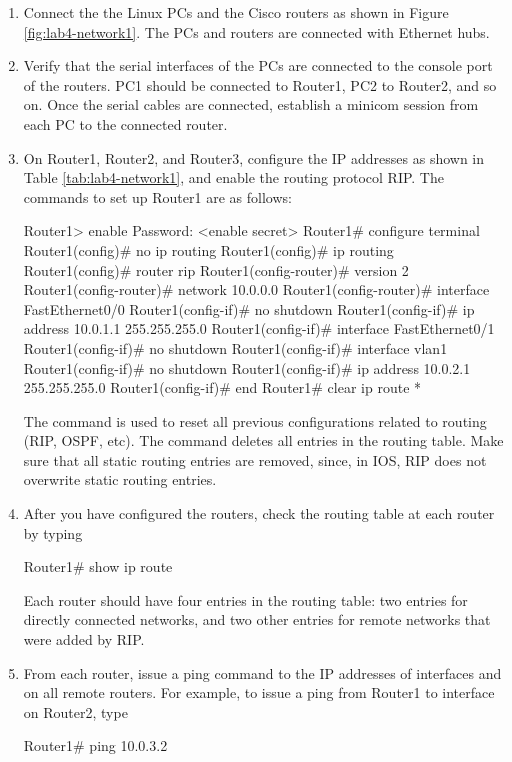 \begin{enumerate}
	\item Connect the the Linux PCs and the Cisco routers as shown in Figure \ref{fig:lab4-network1}. The PCs and routers are connected with Ethernet hubs.
	\item Verify that the serial interfaces of the PCs are connected to the console port of the routers. PC1 should be connected to Router1, PC2 to Router2, and so on. Once the serial cables are connected, establish a minicom session from each PC to the connected router.
	\item On Router1, Router2, and Router3, configure the IP addresses as shown in Table \ref{tab:lab4-network1}, and enable the routing protocol RIP. The commands to set up Router1 are as follows:
		\begin{cmdblock}
	Router1> enable Password: <enable secret>
	Router1# configure terminal
	Router1(config)# no ip routing
	Router1(config)# ip routing
	Router1(config)# router rip
	Router1(config-router)# version 2 
	Router1(config-router)# network 10.0.0.0 
	Router1(config-router)# interface FastEthernet0/0 
	Router1(config-if)# no shutdown
	Router1(config-if)# ip address 10.0.1.1 255.255.255.0 
	Router1(config-if)# interface FastEthernet0/1 
	Router1(config-if)# no shutdown
	Router1(config-if)# interface vlan1
	Router1(config-if)# no shutdown
	Router1(config-if)# ip address 10.0.2.1 255.255.255.0 
	Router1(config-if)# end
	Router1# clear ip route *
		\end{cmdblock}
		The command  is used to reset all previous configurations related to routing (RIP, OSPF, etc). The command  deletes all entries in the routing table. Make sure that all static routing entries are removed, since, in IOS, RIP does not overwrite static routing entries.
	\item After you have configured the routers, check the routing table at each router by typing
		\begin{cmdblock}
	Router1# show ip route
		\end{cmdblock}
		Each router should have four entries in the routing table: two entries for directly connected networks, and two other entries for remote networks that were added by RIP.
	\item From each router, issue a ping command to the IP addresses of interfaces  and  on all remote routers. For example, to issue a ping from Router1 to interface  on Router2, type
		\begin{cmdblock}
	Router1# ping 10.0.3.2
		\end{cmdblock}
\end{enumerate}

